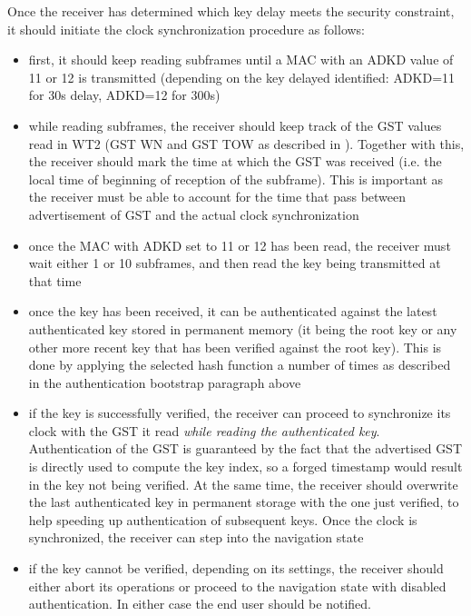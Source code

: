 Once the receiver has determined which key delay meets the security constraint,
it should initiate the clock synchronization procedure as follows:
\begin{itemize}
  \item first, it should keep reading subframes until a MAC with an ADKD value
    of 11 or 12 is transmitted (depending on the key delayed identified:
    \textrm{ADKD=11} for \num{30}\si{s} delay, \textrm{ADKD=12} for
    \num{300}\si{s}) 
  \item while reading subframes, the receiver should keep track of the GST
    values read in WT2 (GST WN and GST TOW as described in \cite{galileoicd}).
    Together with this, the receiver should mark the time at which the GST was
    received (i.e. the local time of beginning of reception of the subframe).
    This is important as the receiver must be able to account for the time that
    pass between advertisement of GST and the actual clock synchronization
  \item once the MAC with ADKD set to 11 or 12 has been read, the receiver must
    wait either 1 or 10 subframes, and then read the key being transmitted at
    that time
  \item once the key has been received, it can be authenticated against the
    latest authenticated key stored in permanent memory (it being the root key
    or any other more recent key that has been verified against the root key).
    This is done by applying the selected hash function a number of times as
    described in the authentication bootstrap paragraph above
  \item if the key is successfully verified, the receiver can proceed to
    synchronize its clock with the GST it read \textit{while reading the
    authenticated key}. Authentication of the GST is guaranteed by the fact that
    the advertised GST is directly used to compute the key index, so a forged
    timestamp would result in the key not being verified. At the same time, the
    receiver should overwrite the last authenticated key in permanent storage
    with the one just verified, to help speeding up authentication of subsequent
    keys. Once the clock is synchronized, the receiver can step into the
    navigation state
  \item if the key cannot be verified, depending on its settings, the receiver
    should either abort its operations or proceed to the navigation state with
    disabled authentication. In either case the end user should be notified.
\end{itemize}

